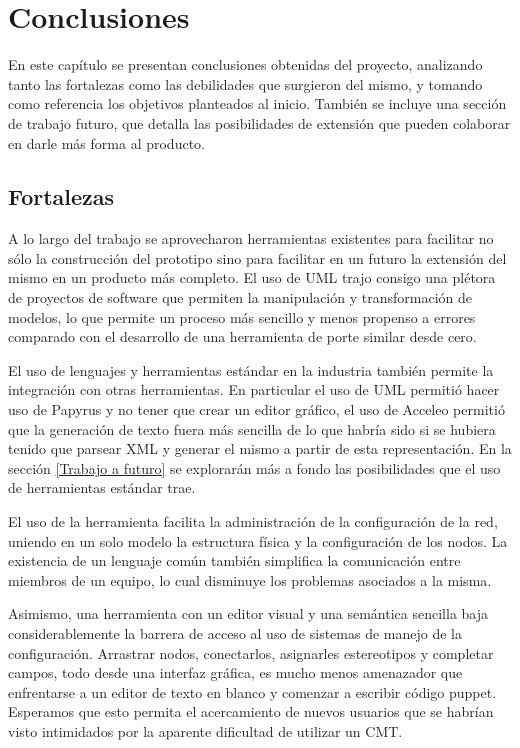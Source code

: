 \chapter{Conclusiones} \label{Conclusiones}
En este capítulo se presentan conclusiones obtenidas del proyecto, analizando tanto las fortalezas como las debilidades que surgieron del mismo, y tomando como referencia los objetivos planteados al inicio. También se incluye una sección de trabajo futuro, que detalla las posibilidades de extensión que pueden colaborar en darle más forma al producto.

\section{Fortalezas}
A lo largo del trabajo se aprovecharon herramientas existentes para facilitar no sólo la construcción del prototipo sino para facilitar en un futuro la extensión del mismo en un producto más completo. El uso de UML trajo consigo una plétora de proyectos de software que permiten la manipulación y transformación de modelos, lo que permite un proceso más sencillo y menos propenso a errores comparado con el desarrollo de una herramienta de porte similar desde cero.

El uso de lenguajes y herramientas estándar en la industria también permite la integración con otras herramientas. En particular el uso de UML permitió hacer uso de Papyrus y no tener que crear un editor gráfico, el uso de Acceleo permitió que la generación de texto fuera más sencilla de lo que habría sido si se hubiera tenido que parsear XML y generar el mismo a partir de esta representación. En la sección \ref{Trabajo a futuro} se explorarán más a fondo las posibilidades que el uso de herramientas estándar trae.

El uso de la herramienta facilita la administración de la configuración de la red, uniendo en un solo modelo la estructura física y la configuración de los nodos. La existencia de un lenguaje común también simplifica la comunicación entre miembros de un equipo, lo cual disminuye los problemas asociados a la misma.

Asimismo, una herramienta con un editor visual y una semántica sencilla baja considerablemente la barrera de acceso al uso de sistemas de manejo de la configuración. Arrastrar nodos, conectarlos, asignarles estereotipos y completar campos, todo desde una interfaz gráfica, es mucho menos amenazador que enfrentarse a un editor de texto en blanco y comenzar a escribir código puppet. Esperamos que esto permita el acercamiento de nuevos usuarios que se habrían visto intimidados por la aparente dificultad de utilizar un CMT.

